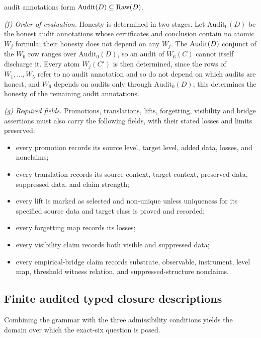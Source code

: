 \begin{definition}
audit annotations form \(\operatorname{Audit}\!\left(D\right)\subseteq\operatorname{Raw}\!\left(D\right)\).
\par\emph{(f) Order of evaluation.} Honesty is determined in
two stages. Let \(\mathrm{Audit}_0(D)\) be the honest audit annotations whose
certificates and conclusion contain no atomic \(W_j\) formula; their honesty
does not depend on any \(W_j\). The \(\operatorname{Audit}\!\left(D\right)\) conjunct of the \(W_6\) row
ranges over \(\mathrm{Audit}_0(D)\), so an audit of \(W_6(C)\) cannot itself
discharge it. Every atom \(W_j(C')\) is then determined, since
the rows of \(W_1,\dots,W_5\) refer to no audit annotation and so do not depend
on which audits are honest, and \(W_6\) depends on audits only through
\(\mathrm{Audit}_0(D)\); this determines the
honesty of the remaining audit annotations.
\par\emph{(g) Required fields.} Promotions,
translations, lifts, forgetting, visibility and bridge assertions must also
carry the following fields, with their stated losses and limits preserved:
\begin{itemize}[topsep=2pt,itemsep=1pt]
  \item every promotion records its source level, target level, added data,
    losses, and nonclaims;
  \item every translation records its source context, target context,
    preserved data, suppressed data, and claim strength;
  \item every lift is marked as selected and non-unique unless uniqueness for its specified source data and target class is proved and recorded;
  \item every forgetting map records its losses;
  \item every visibility claim records both visible and suppressed data;
  \item every empirical-bridge claim records substrate, observable,
    instrument, level map, threshold witness relation, and
    suppressed-structure nonclaims.
\end{itemize}
\end{definition}

\subsection{Finite audited typed closure descriptions}\label{subsec:fatcd}

Combining the grammar with the three admissibility conditions yields
the domain over which the exact-six question is posed.

